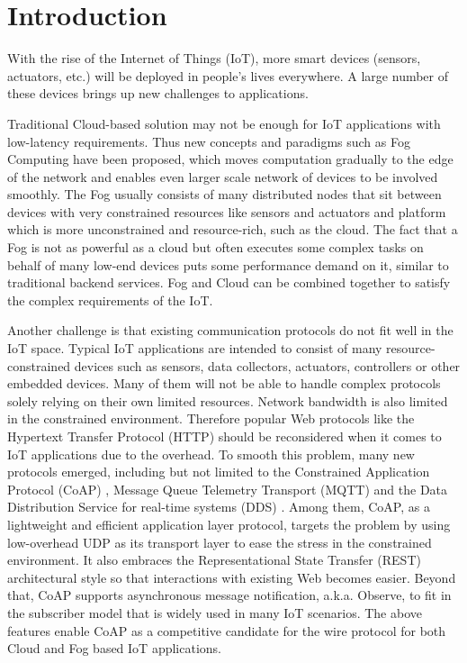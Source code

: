 \chapter{Introduction}\label{ch1}

With the rise of the Internet of Things (IoT), more smart devices (sensors, actuators, etc.) will be deployed in people's lives everywhere. A large number of these devices brings up new challenges to applications. 

Traditional Cloud-based solution may not be enough for IoT applications with low-latency requirements. Thus new concepts and paradigms such as Fog Computing have been proposed, which moves computation gradually to the edge of the network and enables even larger scale network of devices to be involved smoothly. The Fog usually consists of many distributed nodes that sit between devices with very constrained resources like sensors and actuators and platform which is more unconstrained and resource-rich, such as the cloud. The fact that a Fog is not as powerful as a cloud but often executes some complex tasks on behalf of many low-end devices puts some performance demand on it, similar to traditional backend services. Fog and Cloud can be combined together to satisfy the complex requirements of the IoT.

Another challenge is that existing communication protocols do not fit well in the IoT space. Typical IoT applications are intended to consist of many resource-constrained devices such as sensors, data collectors, actuators, controllers or other embedded devices. Many of them will not be able to handle complex protocols solely relying on their own limited resources. Network bandwidth is also limited in the constrained environment. Therefore popular Web protocols like the Hypertext Transfer Protocol (HTTP) should be reconsidered when it comes to IoT applications due to the overhead. To smooth this problem, many new protocols emerged, including but not limited to the Constrained Application Protocol (CoAP) \autocite{coap_protocol}, Message Queue Telemetry Transport (MQTT) \autocite{mqtt_protocol} and the Data Distribution Service for real-time systems (DDS) \autocite{dds}. Among them, CoAP, as a lightweight and efficient application layer protocol, targets the problem by using low-overhead UDP as its transport layer to ease the stress in the constrained environment. It also embraces the Representational State Transfer (REST) \autocite{fielding2000architectural} architectural style so that interactions with existing Web becomes easier. Beyond that, CoAP supports asynchronous message notification, a.k.a. Observe, to fit in the subscriber model that is widely used in many IoT scenarios. The above features enable CoAP as a competitive candidate for the wire protocol for both Cloud and Fog based IoT applications.

